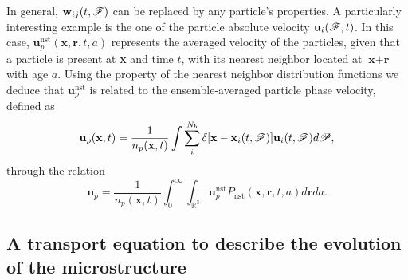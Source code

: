 In general, $\textbf{w}_{ij}(t,\mathscr{F})$ can be replaced by any particle's properties. 
A particularly interesting example is the one of the particle absolute velocity $\textbf{u}_i(\mathscr{F},t)$.
In this case, $\textbf{u}^\text{nst}_p(\textbf{x},\textbf{r},t,a)$ represents the averaged velocity of the particles, given that a particle is present at \textbf{x} and time $t$, with its nearest neighbor located at $\textbf{x}+\textbf{r}$ with age $a$. 
Using the property of the nearest neighbor distribution functions we deduce that  $\textbf{u}^\text{nst}_p$ is related to the ensemble-averaged particle phase velocity, defined as 
\begin{equation*}
    \textbf{u}_p(\textbf{x},t)=\frac{1}{n_p(\textbf{x},t)} 
    \int \sum_{i}^{N_b}\delta[\textbf{x}-\textbf{x}_i(t,\mathscr{F})]  \textbf{u}_i(t,\mathscr{F})d\mathscr{P},
\end{equation*}
through the relation
\begin{equation}
    \textbf{u}_p = \frac{1}{n_p(\textbf{x},t)} \int_0^\infty \int_{\mathbb{R}^3} \textbf{u}_p^\text{nst} P_\text{nst}(\textbf{x},\textbf{r},t,a) d\textbf{r} da. 
    \label{eq:u_p}
\end{equation}




\subsection{A transport equation to describe the evolution of the microstructure}


